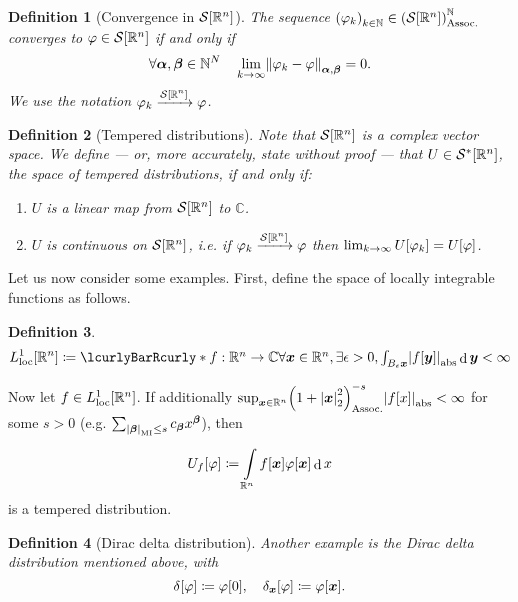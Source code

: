 \documentclass[10pt]{article}
\newtheorem*{definition}{Definition}
\DeclarePairedDelimiter\doubleBars{\Vert}{\Vert}
\DeclarePairedDelimiter\singleBars{\lvert}{\rvert}
\DeclarePairedDelimiter\parentheses{\lparen}{\rparen}
\DeclarePairedDelimiter\squareBrackets{[}{]}
\newcommand{\Dirac}[1][]{\delta_{#1}}
\DeclareMathOperator{\diffd}{d}
\newcommand{\dual}{^*}
\newcommand{\N}{\mathbb{N}}
\newcommand{\R}{\mathbb{R}}
\newcommand{\C}{\mathbb{C}}
\newcommand{\Ball}[2]{B_{#1}{#2}}
\newcommand{\Lspace}[1][\infty]{L^{#1}}
\newcommand{\LspaceLoc}[1][\infty]{\Lspace[{#1}]_{\mathrm{loc}}}
\newcommand{\SchwartzSpace}{\mathcal{S}}
\newcommand\of[1]{\parentheses*{#1}}
\newcommand\pa[1]{\parentheses*{#1}}
\newcommand\abs[1]{\singleBars*{#1}}
\newcommand\norm[1]{\singleBars*{#1}}
\newcommand{\SchwartzNorm}[3]{\doubleBars*{#3}_{#1,#2}}
\newcommand\total[1]{\singleBars*{#1}}
\newcommand{\setst}[2]{\lcurlyBarRcurly*{{\textstyle #1}}{{\textstyle #2}}}
\newcommand\gj\varphi
\renewcommand\ge\epsilon
\newcommand{\vx}{{\vectorsym x}}
\newcommand{\vy}{{\vectorsym y}}
\newcommand{\miga}{{\vectorsym \alpha}}
\newcommand{\migb}{{\vectorsym \beta}}
\newcommand{\funcspec}[3]{{#1}:{#2}\rightarrow{#3}}
\newcommand{\conv}[3][]{%
\ifstrempty{#1}%
{#2 \rightarrow #3}%
{#2\xrightarrow{#1}#3}%
}
\newcommand{\tuplespec}[2]{\parentheses*{#1}_{#2}}
\renewcommand\pa[1]{\parentheses*{#1}_\mathrm{Assoc.}}
\renewcommand\of[1]{\squareBrackets*{#1}}
\renewcommand\total[1]{\singleBars*{#1}_{\mathrm{MI}}}
\renewcommand\norm[1]{\singleBars*{#1}_{2}}
\renewcommand\abs[1]{\singleBars*{#1}_{\mathrm{abs}}}
\newcommand{\Rn}{{\R^n}}
\newcommand{\Schwartz}{{\SchwartzSpace\of{\Rn}}}
\newcommand{\SchwartzDual}{{\SchwartzSpace\dual\of{\Rn}}}
\begin{document}
  \begin{definition}[Convergence in $\Schwartz$]
    The sequence $\tuplespec{\gj_k}{k \in \N} \in \pa\Schwartz^\N$ \emph{converges to} $\gj \in \Schwartz$ if and only if 
    \begin{equation*}
    \forall \miga, \migb \in \N^N \quad \lim_{k \rightarrow \infty}\SchwartzNorm{\miga}{\migb}{\gj_k - \gj}=0.
    \end{equation*}
    We use the notation $\conv[\Schwartz]{\gj_k}\gj$.
  \end{definition}
  \begin{definition}[Tempered distributions]
    Note that $\Schwartz$ is a complex vector space. We define  --- or, more accurately, state without proof --- that $U \in \SchwartzDual$, the space of \emph{tempered distributions}, if and only if:
    \begin{enumerate}
      \item $U$ is a linear map from $\Schwartz$ to $\C$.
      \item $U$ is continuous on $\Schwartz$, i.e. if $\conv[\Schwartz]{\gj_k}\gj$ then $\lim_{\conv k \infty}U\of{\gj_k} = U\of\gj$.
    \end{enumerate}
  \end{definition}
  
  
  Let us now consider some examples. First, define the space of locally integrable functions as follows.
  \begin{definition}
    \begin{equation*}
      \LspaceLoc[1]\of\Rn \coloneqq \setst{\funcspec f \Rn \C}{\forall \vx \in \Rn, \exists \ge > 0, \int{\Ball \ge \vx}\abs{f\of\vy} \diffd{\vy} < \infty}
    \end{equation*}
  \end{definition}
  
  Now let $f \in {\LspaceLoc[1]}\of\Rn$.
  If additionally $\sup_{\vx \in \Rn}\pa{1 + \norm{\vx}^2}^{-s}\abs{f\of{x}} < \infty$
  for some $s > 0$ (e.g. $\sum{\total\migb\leq s} c_\migb x^\migb$),
  then 
  \begin{equation*}
    U_f\of\gj \coloneqq \int\Rn f\of{\vx} \gj\of{\vx} \diffd{x}
  \end{equation*}
  is a tempered distribution.
  \begin{definition}[Dirac delta distribution]
    Another example is the \emph{Dirac delta distribution} mentioned above, with 
    \begin{equation*}
      \Dirac\of\gj \coloneqq \gj\of{0},\quad \Dirac[\vx]\of{\gj} \coloneqq \gj\of{\vx}.
    \end{equation*}
  \end{definition}  
  
\end{document}
